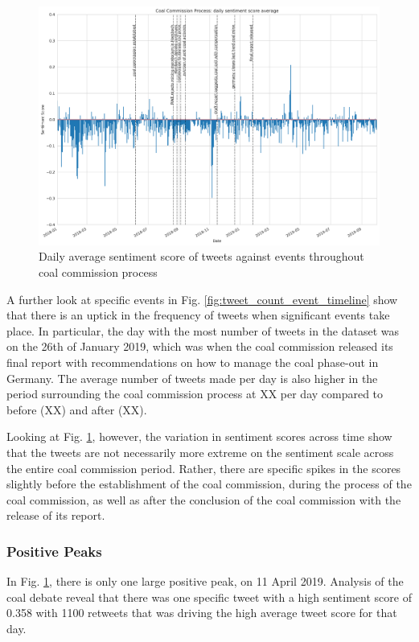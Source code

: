 \documentclass[12pt,onecolumn,twoside]{layout}
\begin{document}
\begin{figure} 
	\begin{center}
		\includegraphics[width=\textwidth]{figures/sa_tweet_score_event_timeline}
	\end{center}
	\caption{Daily average sentiment score of tweets against events throughout coal commission process}
	\label{fig:tweet_score_event_timeline}
\end{figure}

A further look at specific events in Fig. \ref{fig:tweet_count_event_timeline} show that there is an uptick in the frequency of tweets when significant events take place. In particular, the day with the most number of tweets in the dataset was on the 26th of January 2019, which was when the coal commission released its final report with recommendations on how to manage the coal phase-out in Germany. {\color{red}The average number of tweets made per day is also higher in the period surrounding the coal commission process at XX per day compared to before (XX) and after (XX).}

Looking at Fig. \ref{fig:tweet_score_event_timeline}, however, the variation in sentiment scores across time show that the tweets are not necessarily more extreme on the sentiment scale across the entire coal commission period. Rather, there are specific spikes in the scores slightly before the establishment of the coal commission, during the process of the coal commission, as well as after the conclusion of the coal commission with the release of its report. 

\subsubsection*{Positive Peaks} 
In Fig. \ref{fig:tweet_score_event_timeline}, there is only one large positive peak, on 11 April 2019. Analysis of the coal debate reveal that there was one specific tweet with a high sentiment score of 0.358 with 1100 retweets that was driving the high average tweet score for that day.  
\end{document}
